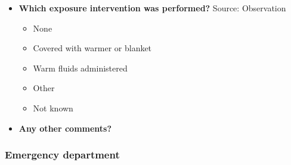 \documentclass[
]{scrartcl}
\providecommand{\tightlist}{%
  \setlength{\itemsep}{0pt}\setlength{\parskip}{0pt}}\usepackage{longtable,booktabs,array}
\begin{document}
\begin{itemize}
  \begin{itemize}
  \tightlist
  \item
    None
  \item
    Placement of definitive airway if the patient had a GCS of 8 or less
  \item
    Log Rolling
  \item
    Spine board during transportation
  \item
    Other
  \item
    Not known
  \end{itemize}
\item
  \textbf{Which exposure intervention was performed?} Source:
  Observation

  \begin{itemize}
  \tightlist
  \item
    None
  \item
    Covered with warmer or blanket
  \item
    Warm fluids administered
  \item
    Other
  \item
    Not known
  \end{itemize}
\item
  \textbf{Any other comments?}
\end{itemize}

\subsubsection{Emergency department}\label{emergency-department}
\end{document}
